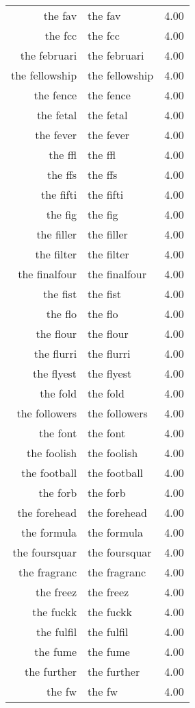 \begin{table}[ht]
\begin{tabular}{rlr}
  the fav & the fav & 4.00 \\ 
  the fcc & the fcc & 4.00 \\ 
  the februari & the februari & 4.00 \\ 
  the fellowship & the fellowship & 4.00 \\ 
  the fence & the fence & 4.00 \\ 
  the fetal & the fetal & 4.00 \\ 
  the fever & the fever & 4.00 \\ 
  the ffl & the ffl & 4.00 \\ 
  the ffs & the ffs & 4.00 \\ 
  the fifti & the fifti & 4.00 \\ 
  the fig & the fig & 4.00 \\ 
  the filler & the filler & 4.00 \\ 
  the filter & the filter & 4.00 \\ 
  the finalfour & the finalfour & 4.00 \\ 
  the fist & the fist & 4.00 \\ 
  the flo & the flo & 4.00 \\ 
  the flour & the flour & 4.00 \\ 
  the flurri & the flurri & 4.00 \\ 
  the flyest & the flyest & 4.00 \\ 
  the fold & the fold & 4.00 \\ 
  the followers & the followers & 4.00 \\ 
  the font & the font & 4.00 \\ 
  the foolish & the foolish & 4.00 \\ 
  the football & the football & 4.00 \\ 
  the forb & the forb & 4.00 \\ 
  the forehead & the forehead & 4.00 \\ 
  the formula & the formula & 4.00 \\ 
  the foursquar & the foursquar & 4.00 \\ 
  the fragranc & the fragranc & 4.00 \\ 
  the freez & the freez & 4.00 \\ 
  the fuckk & the fuckk & 4.00 \\ 
  the fulfil & the fulfil & 4.00 \\ 
  the fume & the fume & 4.00 \\ 
  the further & the further & 4.00 \\ 
  the fw & the fw & 4.00 \\ 

\end{tabular}
\end{table}
